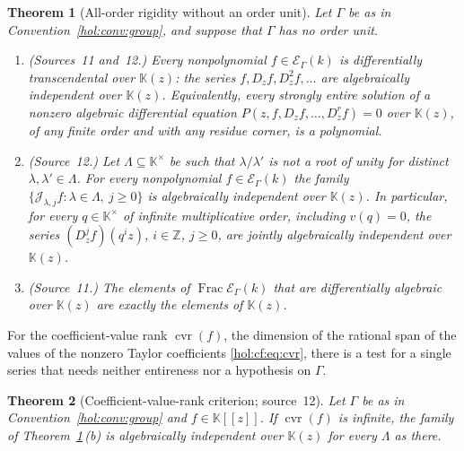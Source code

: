 \documentclass[11pt]{article}
\numberwithin{equation}{section}
\newtheorem{maintheorem}{Theorem}
\theoremstyle{definition}
\theoremstyle{remark}
\newcommand{\Z}{\mathbb Z}
\newcommand{\KK}{\mathbb K}
\newcommand{\EK}{\mathcal E_\Gamma(k)}
\newcommand{\FE}{\operatorname{Frac}\EK}
\newcommand{\cvr}{\operatorname{cvr}}
\newcommand{\jet}[2]{\mathcal J_{#1,#2}}
\begin{document}
\begin{maintheorem}[All-order rigidity without an order unit]
\label{hol:cf:main:entire}
Let $\Gamma$ be as in Convention~\ref{hol:conv:group}, and suppose that
$\Gamma$ has no order unit.
\begin{enumerate}[label=\textup{(\alph*)}]
\item \textup{(Sources~11 and~12.)} Every nonpolynomial $f\in\EK$ is
differentially transcendental over $\KK(z)$: the series $f,D_zf,D_z^2f,\ldots$
are algebraically independent over $\KK(z)$. Equivalently, every strongly
entire solution of a nonzero algebraic differential equation
$P(z,f,D_zf,\ldots,D_z^rf)=0$ over $\KK(z)$, of any finite order and with any
residue corner, is a polynomial.
\item \textup{(Source~12.)} Let $\Lambda\subseteq\KK^\times$ be such that
$\lambda/\lambda'$ is not a root of unity for distinct
$\lambda,\lambda'\in\Lambda$. For every nonpolynomial $f\in\EK$ the family
$\{\jet\lambda jf:\lambda\in\Lambda,\ j\ge0\}$ is algebraically independent
over $\KK(z)$. In particular, for every $q\in\KK^\times$ of infinite
multiplicative order, including $v(q)=0$, the series $(D_z^jf)(q^iz)$,
$i\in\Z$, $j\ge0$, are jointly algebraically independent over $\KK(z)$.
\item \textup{(Source~11.)} The elements of $\FE$ that are differentially
algebraic over $\KK(z)$ are exactly the elements of $\KK(z)$.
\end{enumerate}
\end{maintheorem}

For the coefficient-value rank $\cvr(f)$, the dimension of the rational span
of the values of the nonzero Taylor coefficients \eqref{hol:cf:eq:cvr}, there
is a test for a single series that needs neither entireness nor a hypothesis
on $\Gamma$.

\begin{maintheorem}[Coefficient-value-rank criterion; source~12]
\label{hol:cf:main:rank}
Let $\Gamma$ be as in Convention~\ref{hol:conv:group} and $f\in\KK[[z]]$. If
$\cvr(f)$ is infinite, the family of Theorem~\ref{hol:cf:main:entire}\,(b) is
algebraically independent over $\KK(z)$ for every $\Lambda$ as there.
\end{maintheorem}
\end{document}
